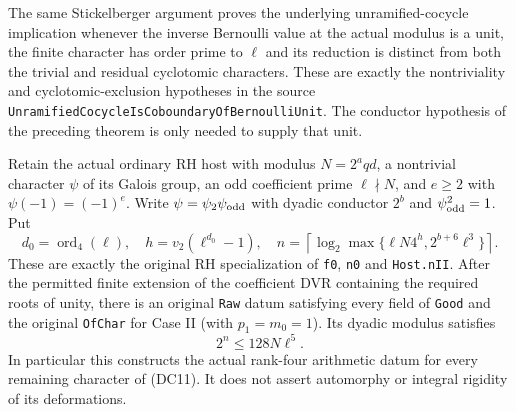 The same Stickelberger argument proves the underlying
unramified-cocycle implication whenever the inverse
Bernoulli value at the actual modulus is a unit, the
finite character has order prime to $\ell$ and its
reduction is distinct from both the trivial and
residual cyclotomic characters. These are exactly the
nontriviality and cyclotomic-exclusion hypotheses in the
source \texttt{UnramifiedCocycleIsCoboundaryOfBernoulliUnit}.
The conductor hypothesis of the preceding theorem is
only needed to supply that unit.

\begin{theorem}
\label{thm:rh-symplectic-arithmetic-data}
Retain the actual ordinary RH host with modulus
$N=2^a qd$, a nontrivial character $\psi$ of its
Galois group, an odd coefficient prime $\ell\nmid N$,
and $e\ge2$ with $\psi(-1)=(-1)^e$.
Write $\psi=\psi_2\psi_{\rm odd}$ with dyadic conductor
$2^b$ and $\psi_{\rm odd}^2=1$. Put
\[
 d_0=\operatorname{ord}_4(\ell),\quad
 h=v_2(\ell^{d_0}-1),\quad
 n=\left\lceil\log_2\max\{\ell N4^h,
                                      2^{b+6}\ell^3\}\right\rceil.
                                                               \tag{BU6}
\]
These are exactly the original RH specialization of
\texttt{f0}, \texttt{n0} and \texttt{Host.nII}.
After the permitted finite extension of the coefficient
DVR containing the required roots of unity, there is
an original \texttt{Raw} datum satisfying every field of
\texttt{Good} and the original \texttt{OfChar} for Case II
(with $p_1=m_0=1$). Its dyadic modulus satisfies
\[
                            2^n\le128N\ell^5.                  \tag{BU7}
\]
In particular this constructs the actual rank-four
arithmetic datum for every remaining character of (DC11).
It does not assert automorphy or integral rigidity of
its deformations.
\end{theorem}

